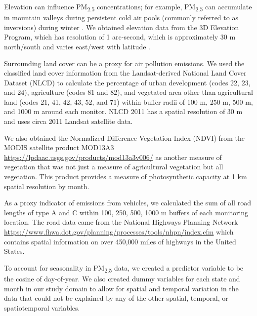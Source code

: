 \documentclass[english]{article}
\begin{document}
Elevation can influence PM\textsubscript{2.5} concentrations; for example, PM\textsubscript{2.5} can accumulate in mountain valleys during persistent cold air pools (commonly referred to as inversions) 
during winter \cite{Whiteman2014}. We obtained elevation data from the 3D Elevation Program, which has resolution of 1 arc-second, which is approximately 30 m north/south and varies east/west with latitude \cite{USGSElevation2017}.

Surrounding land cover can be a proxy for air pollution emissions. We used the classified land cover information from the Landsat-derived National Land Cover Dataset (NLCD) \cite{Homer2017} to calculate the percentage of urban development (codes 22, 23, and 24), agriculture (codes 81 and 82), and vegetated area other than agricultural land (codes 21, 41, 42, 43, 52, and 71) within buffer radii of 100 m, 250 m, 500 m, and 1000 m around each monitor. NLCD 2011 has a spatial resolution of 30 m and uses circa 2011 Landsat satellite data. 

We also obtained the Normalized Difference Vegetation Index (NDVI) from the MODIS satellite product MOD13A3 \url{https://lpdaac.usgs.gov/products/mod13a3v006/} as another measure of vegetation that was not just a measure of agricultural vegetation but all vegetation. This product provides a measure of photosynthetic capacity at 1 km spatial resolution by month. 

As a proxy indicator of emissions from vehicles, we calculated the sum of all road lengths of type A and C within 100, 250, 500, 1000 m buffers of each monitoring location. The road data came from the National Highways Planning Network \url{https://www.fhwa.dot.gov/planning/processes/tools/nhpn/index.cfm} which contains spatial information on over 450,000 miles of highways in the United States. 

To account for seasonality in PM\textsubscript{2.5} data, we created a predictor variable to be the cosine of day-of-year. We also created dummy variables for each state and month in our study domain to allow for spatial and temporal variation in the data that could not be explained by %
any 
of the other spatial, temporal, or spatiotemporal variables. 
\end{document}
